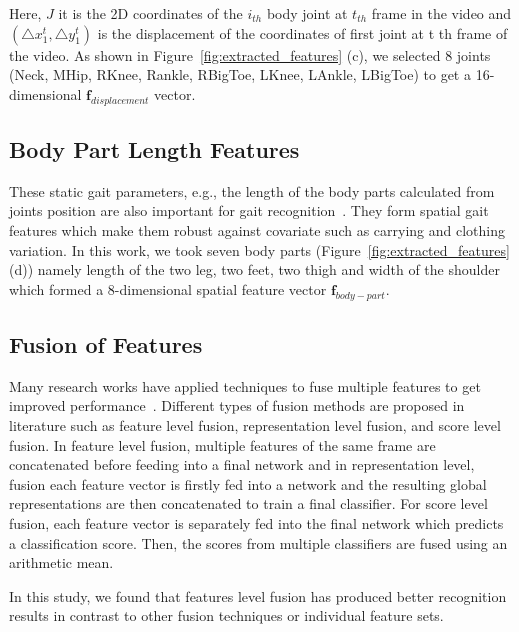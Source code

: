 Here, $J$ it is the 2D coordinates of the $i_{th}$ body joint at $t_{th}$ frame in the video and $(\triangle x_1^t , \triangle y_1^t )$ is the displacement of the coordinates of first joint at t th frame of the video. As shown in Figure~\ref{fig:extracted_features} (c), we selected 8 joints (Neck, MHip, RKnee, Rankle, RBigToe, LKnee, LAnkle, LBigToe) to get a 16-dimensional $\textbf{f}_{displacement}$ vector.


\subsection{Body Part Length Features}
These static gait parameters, e.g., the length of the body parts calculated from joints position are also important for gait recognition~\cite{Wang_04, Araujo_13}. They form spatial gait features which make them robust against covariate such as carrying and clothing variation. In this work, we took seven body parts (Figure~\ref{fig:extracted_features} (d)) namely length of the two leg, two feet, two thigh and width of the shoulder which formed a 8-dimensional spatial feature vector $\textbf{f}_{body-part}$. 


\subsection{Fusion of Features}
Many research works have applied techniques to fuse multiple features to get improved performance~\cite{Liao_19, Wang_04}.  Different types of fusion methods are proposed in literature such as feature level fusion, representation level fusion, and score level fusion. In feature level fusion, multiple features of the same frame are concatenated before feeding into a final network and in representation level, fusion each feature vector is firstly fed into a network and the resulting global representations are then concatenated to train a final classifier. For score level fusion, each feature vector is separately fed into the final network which predicts a classification score. Then, the scores from multiple classifiers are fused using an arithmetic mean.

In this study, we found that features level fusion has produced better recognition results in contrast to other fusion techniques or individual feature sets. 



